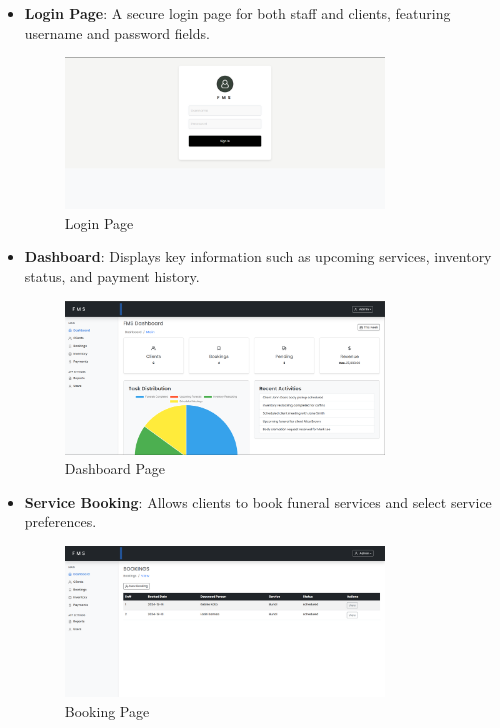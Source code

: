 \documentclass[a4paper,12pt]{report}
\begin{document}
\begin{itemize}
    \item \textbf{Login Page}: A secure login page for both staff and clients, featuring username and password fields.
    \begin{figure}[ht]
        \centering
        \includegraphics[width=0.8\textwidth]{img/Login.png}
        \caption{Login Page}
        \label{fig:login_ui}
    \end{figure}

    \item \textbf{Dashboard}: Displays key information such as upcoming services, inventory status, and payment history.
    \begin{figure}[ht]
        \centering
        \includegraphics[width=0.8\textwidth]{img/dashboard.png}
        \caption{Dashboard Page}
        \label{fig:dashboard_ui}
    \end{figure}

    \item \textbf{Service Booking}: Allows clients to book funeral services and select service preferences.
    \begin{figure}[ht]
        \centering
        \includegraphics[width=0.8\textwidth]{img/bookings.png}
        \caption{Booking Page}
        \label{fig:booking_ui}
    \end{figure}


\end{itemize}
\end{document}
